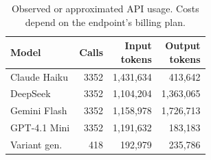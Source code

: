 \begin{table}[t]
\centering
\small
\setlength{\tabcolsep}{4pt}
\renewcommand{\arraystretch}{1.08}
\begin{tabular}{lrrr}
\hline
Model & Calls & \shortstack{Input\\tokens} & \shortstack{Output\\tokens} \\
\hline
Claude Haiku & 3352 & 1,431,634 & 413,642 \\
DeepSeek & 3352 & 1,104,204 & 1,363,065 \\
Gemini Flash & 3352 & 1,158,978 & 1,726,713 \\
GPT-4.1 Mini & 3352 & 1,191,632 & 183,183 \\
Variant gen. & 418 & 192,979 & 235,786 \\
\hline
\end{tabular}
\caption{Observed or approximated API usage. Costs depend on the endpoint's billing plan.}
\label{tab:usage}
\end{table}
